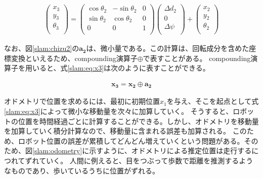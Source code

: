 \begin{align}
  \begin{pmatrix}
    x_3\\
    y_3\\
    \theta_3\\
  \end{pmatrix}
  =
  \begin{pmatrix}
    \cos\theta_2&-\sin\theta_2&0\\
    \sin\theta_2&\cos\theta_2&0\\
    0&0&1\\
  \end{pmatrix}
  \begin{pmatrix}
    \Delta d_2\\
    0\\
    \Delta\psi\\
  \end{pmatrix}
  +
  \begin{pmatrix}
    x_2\\
    y_2\\
    \theta_2\\
  \end{pmatrix} \label{slam:eq:x3}
\end{align}

なお、図\ref{slam:chizu2}の$\bm{a_2}$は、微小量である。この計算は、回転成分を含めた座標変換といえるため、compounding演算子$\oplus$で表すことがある。
compounding演算子を用いると、式\eqref{slam:eq:x3}は次のように表すことができる。

\begin{align}
  \bm{x_3} = \bm{x_2}\oplus\bm{a_2}
\end{align}

オドメトリで位置を求めるには、最初に初期位置$x_1$を与え、そこを起点として式\eqref{slam:eq:x3}によって微小な移動量を次々に加算していく。
そうすると、ロボットの位置を時間経過ごとに計算することができる。しかし、オドメトリを移動量を加算していく積分計算なので、移動量に含まれる誤差も加算される。
このため、ロボット位置の誤差が累積してどんどん増えていくという問題がある。そのため、図\ref{slam:odometry}に示すように、オドメトリによる推定位置は走行するにつれてずれていく。
人間に例えると、目をつぶって歩数で距離を推測するようなものであり、歩いているうちに位置がずれる。


